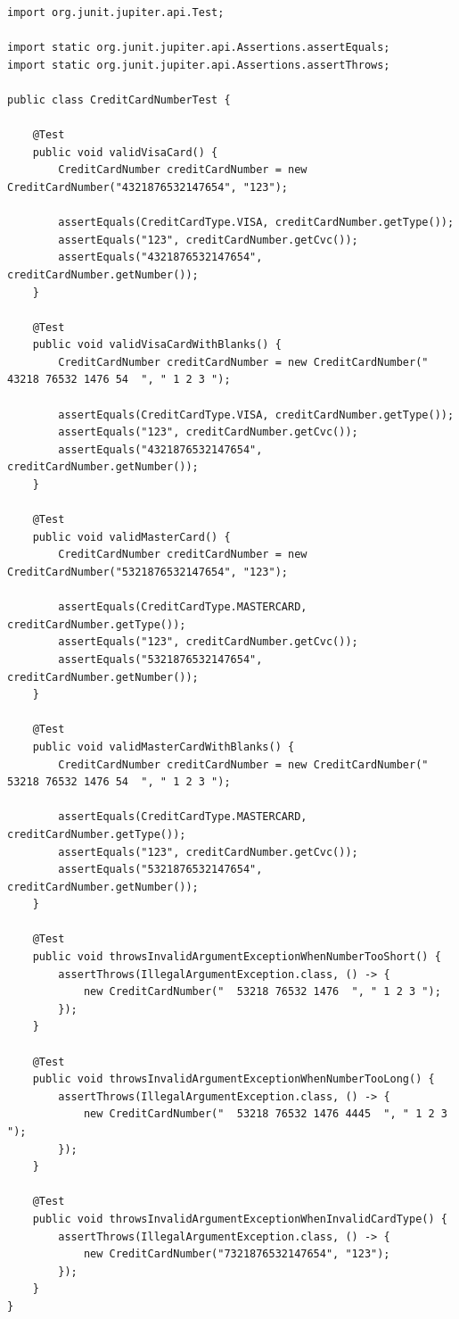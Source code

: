 \begin{lstlisting}
import org.junit.jupiter.api.Test;

import static org.junit.jupiter.api.Assertions.assertEquals;
import static org.junit.jupiter.api.Assertions.assertThrows;

public class CreditCardNumberTest {

	@Test
	public void validVisaCard() {
		CreditCardNumber creditCardNumber = new CreditCardNumber("4321876532147654", "123");

		assertEquals(CreditCardType.VISA, creditCardNumber.getType());
		assertEquals("123", creditCardNumber.getCvc());
		assertEquals("4321876532147654", creditCardNumber.getNumber());
	}

	@Test
	public void validVisaCardWithBlanks() {
		CreditCardNumber creditCardNumber = new CreditCardNumber("  43218 76532 1476 54  ", " 1 2 3 ");

		assertEquals(CreditCardType.VISA, creditCardNumber.getType());
		assertEquals("123", creditCardNumber.getCvc());
		assertEquals("4321876532147654", creditCardNumber.getNumber());
	}

	@Test
	public void validMasterCard() {
		CreditCardNumber creditCardNumber = new CreditCardNumber("5321876532147654", "123");

		assertEquals(CreditCardType.MASTERCARD, creditCardNumber.getType());
		assertEquals("123", creditCardNumber.getCvc());
		assertEquals("5321876532147654", creditCardNumber.getNumber());
	}

	@Test
	public void validMasterCardWithBlanks() {
		CreditCardNumber creditCardNumber = new CreditCardNumber("  53218 76532 1476 54  ", " 1 2 3 ");

		assertEquals(CreditCardType.MASTERCARD, creditCardNumber.getType());
		assertEquals("123", creditCardNumber.getCvc());
		assertEquals("5321876532147654", creditCardNumber.getNumber());
	}

	@Test
	public void throwsInvalidArgumentExceptionWhenNumberTooShort() {
		assertThrows(IllegalArgumentException.class, () -> {
			new CreditCardNumber("  53218 76532 1476  ", " 1 2 3 ");
		});
	}

	@Test
	public void throwsInvalidArgumentExceptionWhenNumberTooLong() {
		assertThrows(IllegalArgumentException.class, () -> {
			new CreditCardNumber("  53218 76532 1476 4445  ", " 1 2 3 ");
		});
	}

	@Test
	public void throwsInvalidArgumentExceptionWhenInvalidCardType() {
		assertThrows(IllegalArgumentException.class, () -> {
			new CreditCardNumber("7321876532147654", "123");
		});
	}
}
\end{lstlisting}

